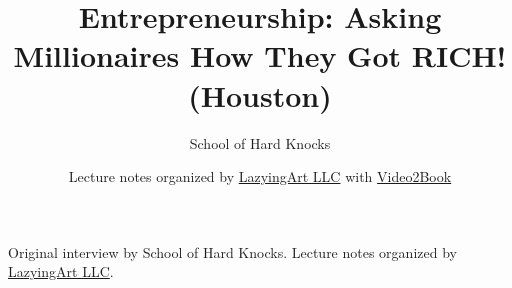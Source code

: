 \documentclass[11pt,oneside]{book}
\begin{document}
\frontmatter
\title{Entrepreneurship: Asking Millionaires How They Got RICH! (Houston)}
\author{School of Hard Knocks}
\date{Lecture notes organized by \href{https://lazying.art}{LazyingArt LLC} with \href{https://github.com/lachlanchen/Video2Book}{Video2Book}}
\maketitle
\begin{center}
\small Original interview by School of Hard Knocks. Lecture notes organized by \href{https://lazying.art}{LazyingArt LLC}.
\end{center}
\clearpage
\mainmatter

\end{document}
